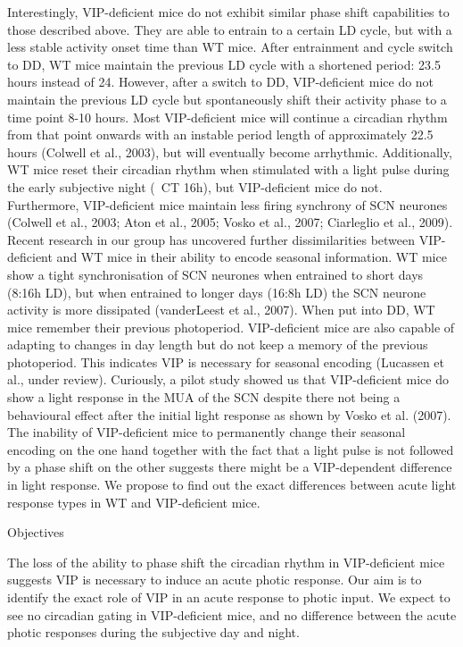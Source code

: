 \begin{multicols}{2}
Interestingly, VIP-deficient mice do not exhibit similar phase shift capabilities to those described above. They are able to entrain to a certain LD cycle, but with a less stable activity onset time than WT mice. After entrainment and cycle switch to DD, WT mice maintain the previous LD cycle with a shortened period: 23.5 hours instead of 24. However, after a switch to DD, VIP-deficient mice do not maintain the previous LD cycle but spontaneously shift their activity phase to a time point 8-10 hours. Most VIP-deficient mice will continue a circadian rhythm from that point onwards with an instable period length of approximately 22.5 hours (Colwell et al., 2003), but will eventually become arrhythmic. Additionally, WT mice reset their circadian rhythm when stimulated with a light pulse during the early subjective night (~CT 16h), but VIP-deficient mice do not. Furthermore, VIP-deficient mice maintain less firing synchrony of SCN neurones (Colwell et al., 2003; Aton et al., 2005; Vosko et al., 2007; Ciarleglio et al., 2009). Recent research in our group has uncovered further dissimilarities between VIP-deficient and WT mice in their ability to encode seasonal information. WT mice show a tight synchronisation of SCN neurones when entrained to short days (8:16h LD), but when entrained to longer days (16:8h LD) the SCN neurone activity is more dissipated (vanderLeest et al., 2007). When put into DD, WT mice remember their previous photoperiod. VIP-deficient mice are also capable of adapting to changes in day length but do not keep a memory of the previous photoperiod. This indicates VIP is necessary for seasonal encoding (Lucassen et al., under review). Curiously, a pilot study showed us that VIP-deficient mice do show a light response in the MUA of the SCN despite there not being a behavioural effect after the initial light response as shown by Vosko et al. (2007). The inability of VIP-deficient mice to permanently change their seasonal encoding on the one hand together with the fact that a light pulse is not followed by a phase shift on the other suggests there might be a VIP-dependent difference in light response. We propose to find out the exact differences between acute light response types in WT and VIP-deficient mice.

Objectives

The loss of the ability to phase shift the circadian rhythm in VIP-deficient mice suggests VIP is necessary to induce an acute photic response. Our aim is to identify the exact role of VIP in an acute response to photic input. We expect to see no circadian gating in VIP-deficient mice, and no difference between the acute photic responses during the subjective day and night.


\end{multicols}
